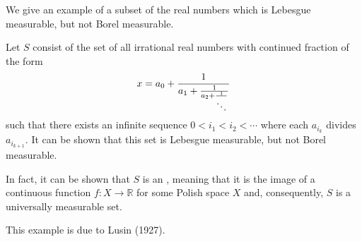 \documentclass[12pt]{article}
\begin{document}
We give an example of a subset of the real numbers which is Lebesgue measurable, but not Borel measurable.

Let $S$ consist of the set of all irrational real numbers with continued fraction of the form
\begin{equation*}
x=a_0+\frac{1}{a_1+\frac{1}{a_2+\frac{1}{\ddots}}}
\end{equation*}
such that there exists an infinite sequence $0<i_1<i_2<\cdots$ where each $a_{i_k}$  divides $a_{i_{k+1}}$.
It can be shown that this set is Lebesgue measurable, but not Borel measurable.

In fact, it can be shown that $S$ is an , meaning that it is the image of a continuous function $f\colon X\rightarrow\mathbb{R}$ for some Polish space $X$ and, consequently, $S$ is a universally measurable set.

This example is due to Lusin (1927).
\end{document}
